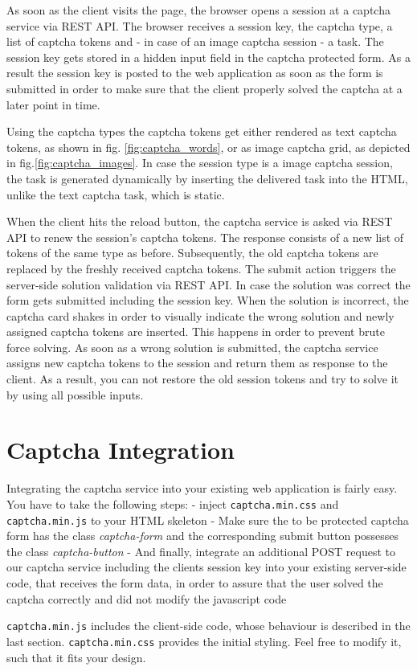  As soon as the client visits the page, the browser opens a session at a captcha service via REST API. The browser receives a session key, the captcha type, a list of captcha tokens and - in case of an image captcha session - a task. The session key gets stored in a hidden input field in the captcha protected form. As a result the session key is posted to the web application as soon as the form is submitted in order to make sure that the client properly solved the captcha at a later point in time. 
 
 Using the captcha types the captcha tokens get either rendered as text captcha tokens, as shown in fig. \ref{fig:captcha_words}, or as image captcha grid, as depicted in fig.\ref{fig:captcha_images}. In case the session type is a image captcha session, the task is generated dynamically by inserting the delivered task into the HTML, unlike the text captcha task, which is static.
 
 When the client hits the reload button, the captcha service is asked via REST API to renew the session's captcha tokens. The response consists of a new list of tokens of the same type as before. Subsequently, the old captcha tokens are replaced by the freshly received captcha tokens. The submit action triggers the server-side solution validation via REST API. In case the solution was correct the form gets submitted including the session key. When the solution is incorrect, the captcha card shakes in order to visually indicate the wrong solution and newly assigned captcha tokens are inserted. This happens in order to prevent brute force solving. As soon as a wrong solution is submitted, the captcha service assigns new captcha tokens to the session and return them as response to the client. As a result, you can not restore the old session tokens and try to solve it by using all possible inputs.

\section{Captcha Integration}
\label{sec:Captcha Integration}

Integrating the captcha service into your existing web application is fairly easy. You have to take the following steps:
- inject \texttt{captcha.min.css} and \texttt{captcha.min.js} to your HTML skeleton
- Make sure the to be protected captcha form has the class \textit{captcha-form} and the corresponding submit button possesses the class \textit{captcha-button}
- And finally, integrate an additional POST request to our captcha service including the clients session key into your existing server-side code, that receives the form data, in order to assure that the user solved the captcha correctly and did not modify the javascript code

\texttt{captcha.min.js} includes the client-side code, whose behaviour is described in the last section. \texttt{captcha.min.css} provides the initial styling. Feel free to modify it, such that it fits your design.

\clearpage
